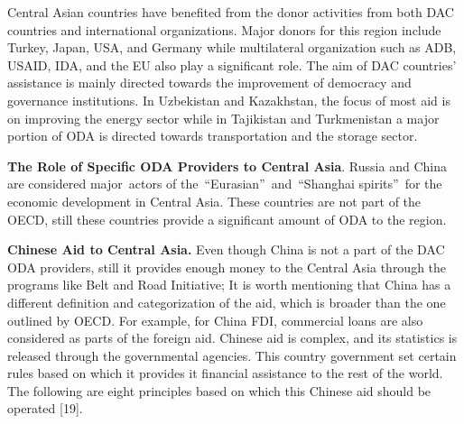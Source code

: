 \begin{multicols}{2}
Central Asian countries have benefited from the donor activities from
both DAC countries and international organizations. Major donors for
this region include Turkey, Japan, USA, and Germany while multilateral
organization such as ADB, USAID, IDA, and the EU also play a significant
role. The aim of DAC countries' assistance is mainly directed towards
the improvement of democracy and governance institutions. In Uzbekistan
and Kazakhstan, the focus of most aid is on improving the energy sector
while in Tajikistan and Turkmenistan a major portion of ODA is directed
towards transportation and the storage sector.

{\bfseries The Role of Specific ODA Providers to Central Asia}. Russia and
China are considered major~actors of the~``Eurasian''~and~``Shanghai
spirits''~for the economic development in Central Asia. These countries
are not part of the OECD, still these countries provide a significant
amount of ODA to the region.

{\bfseries Chinese Aid to Central Asia.} Even though China is not a part of
the DAC ODA providers, still it provides enough money to the Central
Asia through the programs like Belt and Road Initiative; It is worth
mentioning that China has a different definition and categorization of
the aid, which is broader than the one outlined by OECD. For example,
for China FDI, commercial loans are also considered as parts of the
foreign aid. Chinese aid is complex, and its statistics is released
through the governmental agencies. This country government set certain
rules based on which it provides it financial assistance to the rest of
the world. The following are eight principles based on which this
Chinese aid should be operated {[}19{]}.


\end{multicols}
